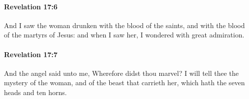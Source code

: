 		\paragraph{Revelation 17:6} %
			\label{REVELATIONNT-17-6}

			And I saw the woman drunken with the blood of the saints, and with the blood of the martyrs of Jesus: and when I saw her, I wondered with great admiration.

			\begin{framed}
			\scriptsize
				\begin{compactdesc}
					\item[SBLG] 
				\end{compactdesc}
			\end{framed}

		\paragraph{Revelation 17:7} %
			\label{REVELATIONNT-17-7}

			And the angel said unto me, Wherefore didst thou marvel? I will tell thee the mystery of the woman, and of the beast that carrieth her, which hath the seven heads and ten horns.

